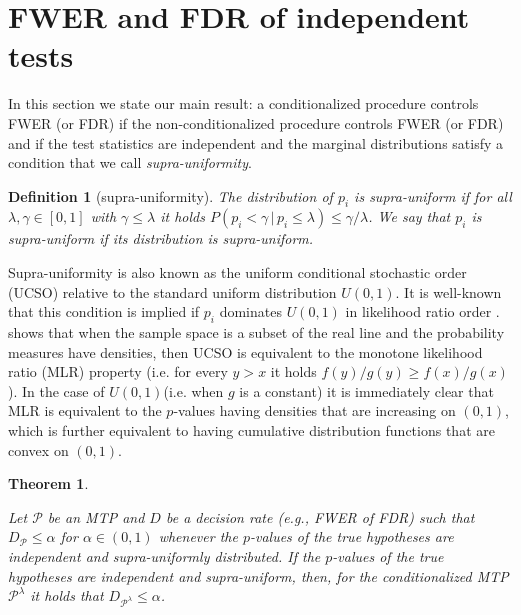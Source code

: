 \documentclass {imsart}
\newtheorem{Definition}{Definition}
\newtheorem{theorem}{Theorem}
\renewcommand{\emph}[1]{\textsl{#1}}
\newcommand{\SUD}{$U(0,1)$\xspace}
\newcommand{\FWER}{\text{$\mathrm{FWER}$}}
\newcommand{\FDR}{\mathrm{FDR}}
\renewcommand{\P}{\mathcal{P}}
\newcommand{\Plam}{\mathcal{P}^\lambda}
\begin{document}
\section{FWER and FDR of independent tests}

In this section we state our main result: a conditionalized procedure controls FWER (or FDR) if the non-conditionalized procedure controls FWER (or FDR) and if the test statistics are independent and the marginal distributions satisfy a condition that we call \emph{supra-uniformity}.

\begin{Definition}[supra-uniformity]
\label{def:supre-uniform}
The distribution of ${p_i}$ is supra-uniform if for all $\lambda ,\gamma  \in [0,1]$ with $ \gamma \leq\lambda$ it holds $P({p_i} < \gamma\,|\,{p_i}\leq\lambda )\leq\gamma /\lambda$. We say that ${p_i}$ is supra-uniform if its distribution is supra-uniform.
\end{Definition}

Supra-uniformity is also known as the uniform conditional stochastic order (UCSO) \citep[defined by][]{Whitt1980, Whitt1982, KS1982,Ruschendorf1991} relative to the standard uniform distribution \SUD. It is well-known that this condition is implied if ${p_i}$ dominates \SUD in likelihood ratio order \citep[e.g.,][]{Whitt1980, Denuit2005}. \citealt{Whitt1980} shows that when the sample space is a subset of the real line and the probability measures have densities, then UCSO is equivalent to the monotone likelihood ratio (MLR) property (i.e. for every $y>x$ it holds $f(y)/g(y)\geq{}f(x)/g(x)$). In the case of \SUD (i.e. when $g$ is a constant) it is immediately clear that MLR is equivalent to the $p$-values having densities that are increasing on $(0,1)$, which is further equivalent to having cumulative distribution functions that are convex on $(0,1)$.

\begin{theorem} \label{thm:independent}

Let $\P$ be an MTP and $D$ be a decision rate (e.g., FWER of FDR) such that $D_{\P}\leq\alpha$ for $\alpha\in(0,1)$ whenever the $p$-values of the true hypotheses are independent and supra-uniformly distributed. If the $p$-values of the true hypotheses are independent and supra-uniform, then, for the conditionalized MTP $\Plam$ it holds that $D_{\Plam}\le\alpha$.
\end{theorem}
\end{document}
